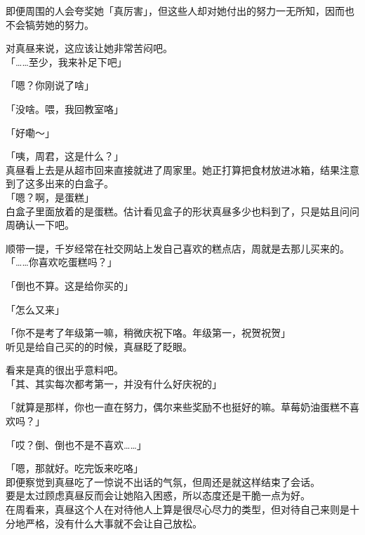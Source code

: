 即便周围的人会夸奖她「真厉害」，但这些人却对她付出的努力一无所知，因而也不会犒劳她的努力。

对真昼来说，这应该让她非常苦闷吧。\\

「……至少，我来补足下吧」

「嗯？你刚说了啥」

「没啥。喂，我回教室咯」

「好嘞～」\\

\vspace{2\baselineskip}

「咦，周君，这是什么？」\\

真昼看上去是从超市回来直接就进了周家里。她正打算把食材放进冰箱，结果注意到了这多出来的白盒子。\\

「嗯？啊，是蛋糕」\\

白盒子里面放着的是蛋糕。估计看见盒子的形状真昼多少也料到了，只是姑且问问周确认一下吧。

顺带一提，千岁经常在社交网站上发自己喜欢的糕点店，周就是去那儿买来的。\\

「……你喜欢吃蛋糕吗？」

「倒也不算。这是给你买的」

「怎么又来」

「你不是考了年级第一嘛，稍微庆祝下咯。年级第一，祝贺祝贺」\\

听见是给自己买的的时候，真昼眨了眨眼。

看来是真的很出乎意料吧。\\

「其、其实每次都考第一，并没有什么好庆祝的」

「就算是那样，你也一直在努力，偶尔来些奖励不也挺好的嘛。草莓奶油蛋糕不喜欢吗？」

「哎？倒、倒也不是不喜欢……」

「嗯，那就好。吃完饭来吃咯」\\

即便察觉到真昼吃了一惊说不出话的气氛，但周还是就这样结束了会话。\\

要是太过顾虑真昼反而会让她陷入困惑，所以态度还是干脆一点为好。\\

在周看来，真昼这个人在对待他人上算是很尽心尽力的类型，但对待自己来则是十分地严格，没有什么大事就不会让自己放松。

